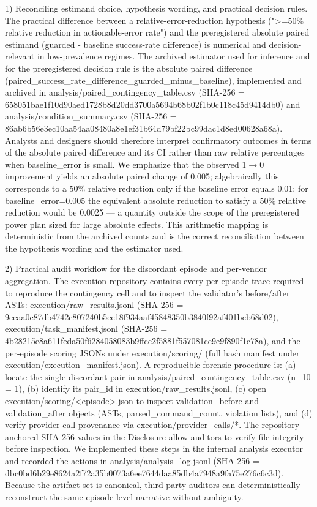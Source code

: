 \documentclass[conference]{IEEEtran}
\begin{document}
1) Reconciling estimand choice, hypothesis wording, and practical decision rules. The practical difference between a relative-error‑reduction hypothesis (">=50\% relative reduction in actionable-error rate") and the preregistered absolute paired estimand (guarded - baseline success-rate difference) is numerical and decision-relevant in low-prevalence regimes. The archived estimator used for inference and for the preregistered decision rule is the absolute paired difference (paired\_success\_rate\_difference\_guarded\_minus\_baseline), implemented and archived in analysis/paired\_contingency\_table.csv (SHA-256 = 658051bae1f10d90aed1728b8d20dd3700a5694b68b02f1b0c118c45d9414db0) and analysis/condition\_summary.csv (SHA-256 = 86ab6b56e3ec10aa54aa08480a8e1ef31b64d79bf22bc99dac1d8ed00628a68a). Analysts and designers should therefore interpret confirmatory outcomes in terms of the absolute paired difference and its CI rather than raw relative percentages when baseline\_error is small. We emphasize that the observed 1\ensuremath{\rightarrow}0 improvement yields an absolute paired change of 0.005; algebraically this corresponds to a 50\% relative reduction only if the baseline error equals 0.01; for baseline\_error=0.005 the equivalent absolute reduction to satisfy a 50\% relative reduction would be 0.0025 --- a quantity outside the scope of the preregistered power plan sized for large absolute effects. This arithmetic mapping is deterministic from the archived counts and is the correct reconciliation between the hypothesis wording and the estimator used.

2) Practical audit workflow for the discordant episode and per‑vendor aggregation. The execution repository contains every per-episode trace required to reproduce the contingency cell and to inspect the validator's before/after ASTs: execution/raw\_results.jsonl (SHA-256 = 9eeaa0c87db4742c807240b5ee18f934aaf45848350b3840f92af401bcb68d02), execution/task\_manifest.jsonl (SHA-256 = 4b28215e8a611feda50f6284058083b9ffcc2f5881f557081ce9e9f890f1c78a), and the per-episode scoring JSONs under execution/scoring/ (full hash manifest under execution/execution\_manifest.json). A reproducible forensic procedure is: (a) locate the single discordant pair in analysis/paired\_contingency\_table.csv (n\_10 = 1), (b) identify its pair\_id in execution/raw\_results.jsonl, (c) open execution/scoring/<episode>.json to inspect validation\_before and validation\_after objects (ASTs, parsed\_command\_count, violation lists), and (d) verify provider-call provenance via execution/provider\_calls/*. The repository-anchored SHA‑256 values in the Disclosure allow auditors to verify file integrity before inspection. We implemented these steps in the internal analysis executor and recorded the actions in analysis/analysis\_log.jsonl (SHA-256 = dbc0bd6b29e8624a2f72a35b0073a6ee7644daa85db4a7948a9fa75e276c6c3d). Because the artifact set is canonical, third-party auditors can deterministically reconstruct the same episode-level narrative without ambiguity.
\end{document}
